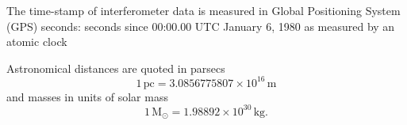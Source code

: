 \documentclass[12pt,notitlepage]{report}
\begin{document}
The time-stamp of interferometer data is measured in Global Positioning System
(GPS) seconds: seconds since 00:00.00 UTC January 6, 1980 as measured by an
atomic clock

Astronomical distances are quoted in parsecs
\begin{equation}
1\,\mathrm{pc} = 3.0856775807 \times 10^{16}\,\mathrm{m}
\end{equation}
and masses in units of solar mass
\begin{equation}
1\,\mathrm{M}_\odot = 1.98892 \times 10^{30}\,\mathrm{kg}.
\end{equation}

\afterpreface

\label{ch:introduction}

\label{ch:inspiral}

\label{ch:macho}

\label{ch:findchirp}

\label{ch:pipeline}

\label{ch:hardware}

%
\label{ch:result}

\label{ch:conclusion}


\clearpage



\clearpage
{}

\begin{startvita}
\end{startvita}

\renewenvironment{thebibliography}[1]%
  {\begin{list}{\labelenumi\hss}%
     {\usecounter{enumi}\setlength{\labelwidth}{3em}%
      \setlength{\leftmargin}{5em}}}%
  {\end{list}}
\renewcommand{\bibitem}[1]{\item\label{#1}\relax}%
\renewcommand{\theenumi}{\arabic{enumi}}%
\begin{publications}
\putbib[papers]
\end{publications}

\finishvita
\end{document}
